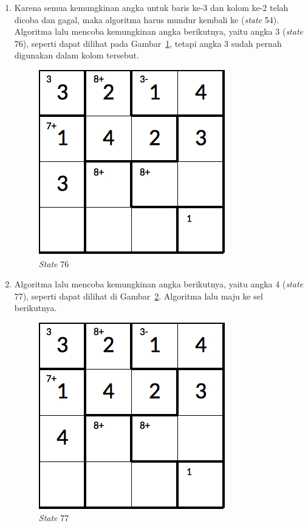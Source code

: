 \begin{enumerate}
\item Karena semua kemungkinan angka untuk baris ke-3 dan kolom ke-2 telah dicoba dan gagal, maka algoritma harus mundur kembali ke (\textit{state} 54). Algoritma lalu mencoba kemungkinan angka berikutnya, yaitu angka 3 (\textit{state} 76), seperti dapat dilihat pada Gambar~\ref{fig:lampiranbt24}, tetapi angka 3 sudah pernah digunakan dalam kolom tersebut.

\begin{figure}
\centering
\captionsetup{justification=centering}
\includegraphics[scale=0.333]{Gambar/backtracking/State76}
\caption[\textit{State} 76]{\textit{State} 76}
\label{fig:lampiranbt24}
\end{figure}

\item Algoritma lalu mencoba kemungkinan angka berikutnya, yaitu angka 4 (\textit{state} 77), seperti dapat dilihat di Gambar~\ref{fig:lampiranbt25}. Algoritma lalu maju ke sel berikutnya.

\begin{figure}
\centering
\captionsetup{justification=centering}
\includegraphics[scale=0.333]{Gambar/backtracking/State77}
\caption[\textit{State} 77]{\textit{State} 77}
\label{fig:lampiranbt25}
\end{figure}


\end{enumerate}

